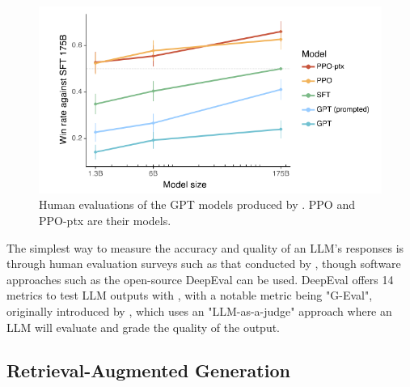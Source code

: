 \documentclass[12pt]{report}
\begin{document}

    \begin{figure}[H] 
        \centering
        \includegraphics[width=.85\linewidth]{ouyangLLMPreference.png}
        \caption{Human evaluations of the GPT models produced by \textcite{ouyang_training_2022}. PPO and PPO-ptx are their models.}
        \label{fig:LLMPref}
    \end{figure}

    The simplest way to measure the accuracy and quality of an LLM's responses is through human evaluation surveys such as that conducted by \textcite{ouyang_training_2022}, though
    software approaches such as the open-source DeepEval can be used. DeepEval offers 14 metrics to test LLM outputs with \autocite{deepeval_introduction_2024},
    with a notable metric being "G-Eval", originally introduced by \textcite{liu_g-eval_2023}, which uses an "LLM-as-a-judge" approach where an LLM will evaluate
    and grade the quality of the output.


    \subsection{Retrieval-Augmented Generation}
    
\end{document}
